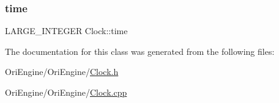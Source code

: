 \hypertarget{class_ori_engine_1_1_clock_a38fb078b0bae590ca4ef633654082385}{}\label{class_ori_engine_1_1_clock_a38fb078b0bae590ca4ef633654082385} 
\subsubsection{\texorpdfstring{time}{time}}
{\footnotesize\ttfamily L\+A\+R\+G\+E\+\_\+\+I\+N\+T\+E\+G\+ER Clock\+::time\hspace{0.3cm}{\ttfamily [static]}}



The documentation for this class was generated from the following files\+:\begin{DoxyCompactItemize}
\item 
Ori\+Engine/\+Ori\+Engine/\hyperlink{_clock_8h}{Clock.\+h}\item 
Ori\+Engine/\+Ori\+Engine/\hyperlink{_clock_8cpp}{Clock.\+cpp}\end{DoxyCompactItemize}
